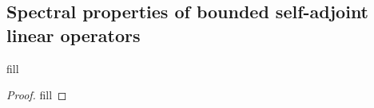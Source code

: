 \subsection{Spectral properties of bounded self-adjoint linear operators}

\begin{exercise}{1}
fill
\end{exercise}
\begin{proof}
fill
\end{proof}
